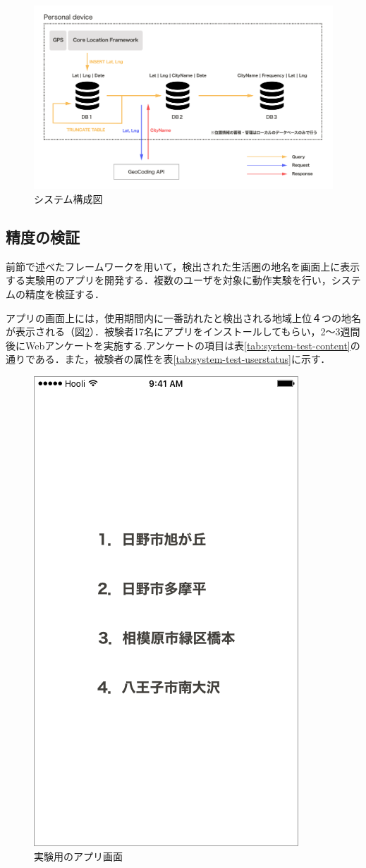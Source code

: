 \documentclass[a4paper]{jsarticle}
\begin{document}
\fifigure
\begin{figure}[H]
  \begin{center}
    \includegraphics[width=1.0\hsize]{./images/livingarea_diagram.png}
    \caption{システム構成図}
    \label{fig:livingarea-diagram}
  \end{center}
\end{figure}
\fi

\subsection{精度の検証}
前節で述べたフレームワークを用いて，検出された生活圏の地名を画面上に表示する実験用のアプリを開発する．複数のユーザを対象に動作実験を行い，システムの精度を検証する．

アプリの画面上には，使用期間内に一番訪れたと検出される地域上位４つの地名が表示される（図\ref{fig:system-ui}）．被験者17名にアプリをインストールしてもらい，2〜3週間後にWebアンケートを実施する.アンケートの項目は表\ref{tab:system-test-content}の通りである．また，被験者の属性を表\ref{tab:system-test-userstatus}に示す．

\fifigure
\begin{figure}[H]
  \begin{center}
    \includegraphics[width=0.4\hsize]{./images/system.png}
    \caption{実験用のアプリ画面}
    \label{fig:system-ui}
  \end{center}
\end{figure}
\fi
\end{document}
